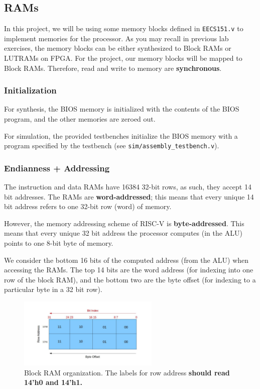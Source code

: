 \documentclass[11pt]{article}
\begin{document}
\subsection{RAMs}
\label{ram_info}
In this project, we will be using some memory blocks defined in \verb|EECS151.v| to implement memories for the processor.
As you may recall in previous lab exercises, the memory blocks can be either synthesized to Block RAMs or LUTRAMs on FPGA.
For the project, our memory blocks will be mapped to Block RAMs. Therefore, read and write to memory are \textbf{synchronous}.

\subsubsection{Initialization}

For synthesis, the BIOS memory is initialized with the contents of the BIOS program, and the other memories are zeroed out.

For simulation, the provided testbenches initialize the BIOS memory with a program specified by the testbench (see \verb|sim/assembly_testbench.v|).

\subsubsection{Endianness + Addressing}
The instruction and data RAMs have 16384 32-bit rows, as such, they accept 14 bit addresses.
The RAMs are \textbf{word-addressed}; this means that every unique 14 bit address refers to one 32-bit row (word) of memory.

However, the memory addressing scheme of RISC-V is \textbf{byte-addressed}.
This means that every unique 32 bit address the processor computes (in the ALU) points to one 8-bit byte of memory.

We consider the bottom 16 bits of the computed address (from the ALU) when accessing the RAMs.
The top 14 bits are the word address (for indexing into one row of the block RAM), and the bottom two are the byte offset (for indexing to a particular byte in a 32 bit row).

\label{endianness}
\begin{figure}[H]
  \begin{center}
    \includegraphics[width=0.6\textwidth]{endianness_img}
    \caption{Block RAM organization. The labels for row address \textbf{should read 14'h0 and 14'h1.}}
    \label{fig:endianness_img}
  \end{center}
\end{figure}
\end{document}
